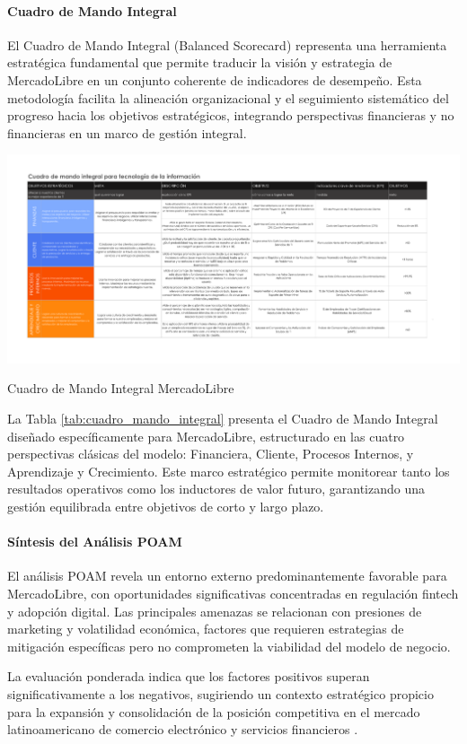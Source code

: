 \paragraph{Cuadro de Mando Integral}

El Cuadro de Mando Integral (Balanced Scorecard) representa una herramienta estratégica fundamental que permite traducir la visión y estrategia de MercadoLibre en un conjunto coherente de indicadores de desempeño. Esta metodología facilita la alineación organizacional y el seguimiento sistemático del progreso hacia los objetivos estratégicos, integrando perspectivas financieras y no financieras en un marco de gestión integral.

\begin{table}[H]
    \centering
    \includegraphics[width=\linewidth, height=0.8\textheight, keepaspectratio]{sections/Cuadro_Mando_Mercado_Libre.pdf}
    \caption{Cuadro de Mando Integral MercadoLibre}
    \label{tab:cuadro_mando_integral}
\end{table}

La Tabla \ref{tab:cuadro_mando_integral} presenta el Cuadro de Mando Integral diseñado específicamente para MercadoLibre, estructurado en las cuatro perspectivas clásicas del modelo: Financiera, Cliente, Procesos Internos, y Aprendizaje y Crecimiento. Este marco estratégico permite monitorear tanto los resultados operativos como los inductores de valor futuro, garantizando una gestión equilibrada entre objetivos de corto y largo plazo.

\paragraph{Síntesis del Análisis POAM}

El análisis POAM revela un entorno externo predominantemente favorable para MercadoLibre, con oportunidades significativas concentradas en regulación fintech y adopción digital. Las principales amenazas se relacionan con presiones de marketing y volatilidad económica, factores que requieren estrategias de mitigación específicas pero no comprometen la viabilidad del modelo de negocio.

La evaluación ponderada indica que los factores positivos superan significativamente a los negativos, sugiriendo un contexto estratégico propicio para la expansión y consolidación de la posición competitiva en el mercado latinoamericano de comercio electrónico y servicios financieros \autocite{porter1985}.
